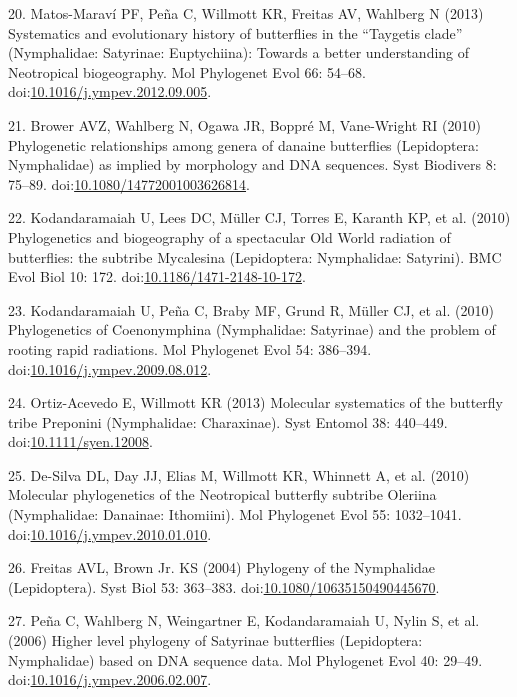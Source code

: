 \documentclass[10pt]{article}
\begin{document}
20. Matos-Maraví PF, Peña C, Willmott KR, Freitas AV, Wahlberg N (2013)
Systematics and evolutionary history of butterflies in the ``Taygetis
clade'' (Nymphalidae: Satyrinae: Euptychiina): Towards a better
understanding of Neotropical biogeography. Mol Phylogenet Evol 66:
54--68.
doi:\href{http://dx.doi.org/10.1016/j.ympev.2012.09.005}{10.1016/j.ympev.2012.09.005}.

21. Brower AVZ, Wahlberg N, Ogawa JR, Boppré M, Vane-Wright RI (2010)
Phylogenetic relationships among genera of danaine butterflies
(Lepidoptera: Nymphalidae) as implied by morphology and DNA sequences.
Syst Biodivers 8: 75--89.
doi:\href{http://dx.doi.org/10.1080/14772001003626814}{10.1080/14772001003626814}.

22. Kodandaramaiah U, Lees DC, Müller CJ, Torres E, Karanth KP, et al.
(2010) Phylogenetics and biogeography of a spectacular Old World
radiation of butterflies: the subtribe Mycalesina (Lepidoptera:
Nymphalidae: Satyrini). BMC Evol Biol 10: 172.
doi:\href{http://dx.doi.org/10.1186/1471-2148-10-172}{10.1186/1471-2148-10-172}.

23. Kodandaramaiah U, Peña C, Braby MF, Grund R, Müller CJ, et al.
(2010) Phylogenetics of Coenonymphina (Nymphalidae: Satyrinae) and the
problem of rooting rapid radiations. Mol Phylogenet Evol 54: 386--394.
doi:\href{http://dx.doi.org/10.1016/j.ympev.2009.08.012}{10.1016/j.ympev.2009.08.012}.

24. Ortiz-Acevedo E, Willmott KR (2013) Molecular systematics of the
butterfly tribe Preponini (Nymphalidae: Charaxinae). Syst Entomol 38:
440--449.
doi:\href{http://dx.doi.org/10.1111/syen.12008}{10.1111/syen.12008}.

25. De-Silva DL, Day JJ, Elias M, Willmott KR, Whinnett A, et al. (2010)
Molecular phylogenetics of the Neotropical butterfly subtribe Oleriina
(Nymphalidae: Danainae: Ithomiini). Mol Phylogenet Evol 55: 1032--1041.
doi:\href{http://dx.doi.org/10.1016/j.ympev.2010.01.010}{10.1016/j.ympev.2010.01.010}.

26. Freitas AVL, Brown Jr. KS (2004) Phylogeny of the Nymphalidae
(Lepidoptera). Syst Biol 53: 363--383.
doi:\href{http://dx.doi.org/10.1080/10635150490445670}{10.1080/10635150490445670}.

27. Peña C, Wahlberg N, Weingartner E, Kodandaramaiah U, Nylin S, et al.
(2006) Higher level phylogeny of Satyrinae butterflies (Lepidoptera:
Nymphalidae) based on DNA sequence data. Mol Phylogenet Evol 40: 29--49.
doi:\href{http://dx.doi.org/10.1016/j.ympev.2006.02.007}{10.1016/j.ympev.2006.02.007}.
\end{document}
